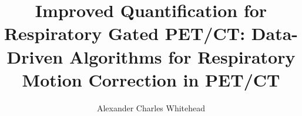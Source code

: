 \title{Improved Quantification for Respiratory Gated PET/CT: Data-Driven Algorithms for Respiratory Motion Correction in PET/CT}
\author{Alexander Charles Whitehead}

\maketitle





\tableofcontents
\listoffigures
\listoftables
\printglossaries
